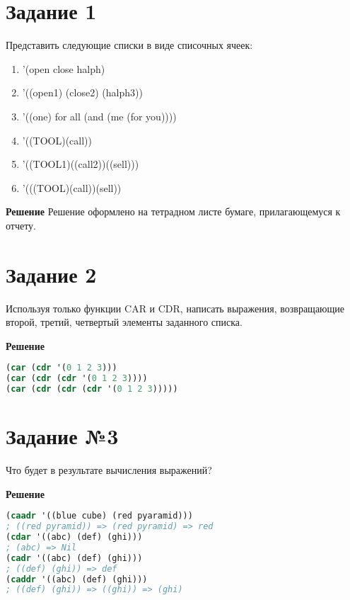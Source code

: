\section*{Задание 1}
Представить следующие списки в виде списочных ячеек:
	\begin{enumerate}
		\item ’(open close halph)
		
		\item ’((open1) (close2) (halph3))
		
		\item ’((one) for all (and (me (for you))))
		
		\item ’((TOOL)(call))
		
		\item ’((TOOL1)((call2))((sell)))
		
		\item ’(((TOOL)(call))(sell))
	\end{enumerate}
	
	\textbf{Решение}
	Решение оформлено на тетрадном листе бумаге, прилагающемуся к отчету.	
	
\section*{Задание 2}

Используя только функции CAR и CDR, написать выражения, возвращающие второй, третий, четвертый элементы заданного списка.
	
\textbf{Решение}

\begin{lstlisting}[label=first,caption=Решение задания №2, language=lisp]
(car (cdr '(0 1 2 3)))
(car (cdr (cdr '(0 1 2 3))))
(car (cdr (cdr (cdr '(0 1 2 3)))))
\end{lstlisting}

\section*{Задание №3}

Что будет в результате вычисления выражений?

\textbf{Решение}

\begin{lstlisting}[label=second,caption=Решение задания №3, language=lisp]
(caadr '((blue cube) (red pyaramid))) 
; ((red pyramid)) => (red pyramid) => red
(cdar '((abc) (def) (ghi)))
; (abc) => Nil
(cadr '((abc) (def) (ghi))) 
; ((def) (ghi)) => def
(caddr '((abc) (def) (ghi)))
; ((def) (ghi)) => ((ghi)) => (ghi)
\end{lstlisting}

